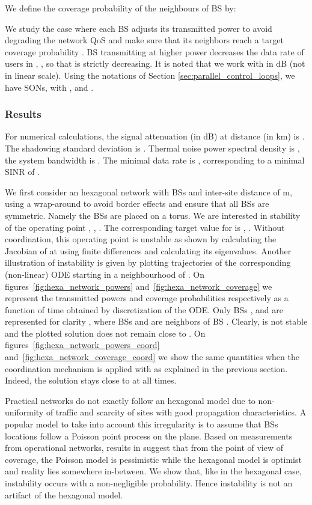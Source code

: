 \documentclass[10pt,conference,letterpaper]{IEEEtran}
\begin{document}
 We define  the coverage probability of the neighbours of \ac{BS}  by:
 
	We study the case where each \ac{BS} adjusts its transmitted power  to avoid degrading the network \ac{QoS} and make sure that its neighbors reach a target coverage probability . \ac{BS}  transmitting at higher power decreases the data rate of users in  , , so that  is strictly decreasing. It is noted that we work with  in dB (not in linear scale). Using the notations of Section \ref{sec:parallel_control_loops}, we have  \acp{SON}, with , and .
	
	\subsubsection{Results}
	For numerical calculations, the signal attenuation (in dB) at distance  (in km) is . The shadowing standard deviation is . Thermal noise power spectral density is , the system bandwidth  is . The minimal data rate  is , corresponding to a minimal \ac{SINR} of . 
	
	We first consider an hexagonal network with  \acp{BS} and inter-site distance of  m, using a wrap-around to avoid border effects and ensure that all \acp{BS} are symmetric.  Namely the \acp{BS} are placed on a torus. We are interested in stability of the operating point  ,  , . The corresponding target value for  is , . Without coordination, this operating point is unstable as shown by calculating the Jacobian of  at  using finite differences and calculating its eigenvalues. Another illustration of instability is given by plotting trajectories of the corresponding (non-linear) \ac{ODE} starting in a neighbourhood of . On figures~\ref{fig:hexa_network_powers} and~\ref{fig:hexa_network_coverage} we represent the transmitted powers and coverage probabilities respectively as a function of time obtained by discretization of the \ac{ODE}. Only \acp{BS} ,  and  are represented for clarity , where \acp{BS}  and  are neighbors of \ac{BS} . Clearly,  is not stable and the plotted solution does not remain close to . On figures~\ref{fig:hexa_network_powers_coord} and~\ref{fig:hexa_network_coverage_coord} we show the same quantities when the coordination mechanism is applied with  as explained in the previous section. Indeed, the solution stays close to  at all times. 

	Practical networks do not exactly follow an hexagonal model due to non-uniformity of traffic and scarcity of sites with good propagation characteristics. A popular model to take into account this irregularity is to assume that \acp{BS} locations follow a Poisson point process on the plane. Based on measurements from operational networks, results in \cite{AndrewsBaccelliGeometry} suggest that from the point of view of coverage, the Poisson model is pessimistic while the hexagonal model is optimist and reality lies somewhere in-between. We show that, like in the hexagonal case, instability occurs with a non-negligible probability. Hence instability is not an artifact of the hexagonal model. 
	
\end{document}
